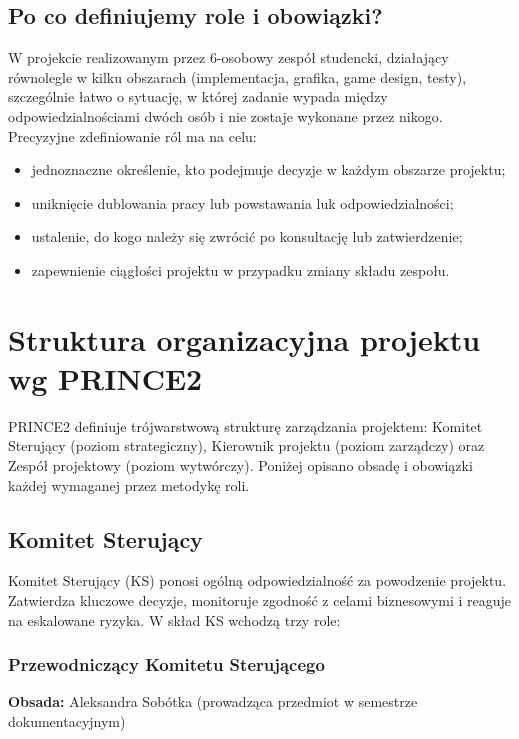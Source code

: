 \documentclass[11pt,a4paper]{article}
\begin{document}
\subsection{Po co definiujemy role i obowiązki?}
W projekcie realizowanym przez 6-osobowy zespół studencki, działający równolegle w kilku obszarach (implementacja, grafika, game design, testy), szczególnie łatwo o sytuację, w której zadanie wypada między odpowiedzialnościami dwóch osób i nie zostaje wykonane przez nikogo. Precyzyjne zdefiniowanie ról ma na celu:

\begin{itemize}[noitemsep]
    \item jednoznaczne określenie, kto podejmuje decyzje w każdym obszarze projektu;
    \item uniknięcie dublowania pracy lub powstawania luk odpowiedzialności;
    \item ustalenie, do kogo należy się zwrócić po konsultację lub zatwierdzenie;
    \item zapewnienie ciągłości projektu w przypadku zmiany składu zespołu.
\end{itemize}

\section{Struktura organizacyjna projektu wg PRINCE2}

PRINCE2 definiuje trójwarstwową strukturę zarządzania projektem: Komitet Sterujący (poziom strategiczny), Kierownik projektu (poziom zarządczy) oraz Zespół projektowy (poziom wytwórczy). Poniżej opisano obsadę i obowiązki każdej wymaganej przez metodykę roli.

\subsection{Komitet Sterujący}

Komitet Sterujący (KS) ponosi ogólną odpowiedzialność za powodzenie projektu. Zatwierdza kluczowe decyzje, monitoruje zgodność z celami biznesowymi i reaguje na eskalowane ryzyka. W skład KS wchodzą trzy role:

\subsubsection{Przewodniczący Komitetu Sterującego}
\textbf{Obsada:} Aleksandra Sobótka (prowadząca przedmiot w semestrze dokumentacyjnym)
\end{document}
